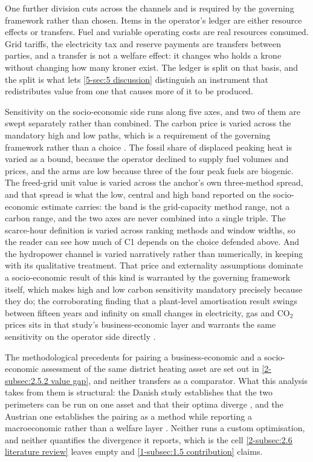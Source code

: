 One further division cuts across the channels and is required by the governing framework rather than chosen. Items in the operator's ledger are either resource effects or transfers. Fuel and variable operating costs are real resources consumed. Grid tariffs, the electricity tax and reserve payments are transfers between parties, and a transfer is not a welfare effect: it changes who holds a krone without changing how many kroner exist. The ledger is split on that basis, and the split is what lets \autoref{5-sec:5 discussion} distinguish an instrument that redistributes value from one that causes more of it to be produced.

Sensitivity on the socio-economic side runs along five axes, and two of them are swept separately rather than combined. The carbon price is varied across the mandatory high and low paths, which is a requirement of the governing framework rather than a choice \cite{finansdepartement_prinsipper_2021}. The fossil share of displaced peaking heat is varied as a bound, because the operator declined to supply fuel volumes and prices, and the arms are low because three of the four peak fuels are biogenic. The freed-grid unit value is varied across the anchor's own three-method spread, and that spread is what the low, central and high band reported on the socio-economic estimate carries: the band is the grid-capacity method range, not a carbon range, and the two axes are never combined into a single triple. The scarce-hour definition is varied across ranking methods and window widths, so the reader can see how much of C1 depends on the choice defended above. And the hydropower channel is varied narratively rather than numerically, in keeping with its qualitative treatment. That price and externality assumptions dominate a socio-economic result of this kind is warranted by the governing framework itself, which makes high and low carbon sensitivity mandatory precisely because they do; the corroborating finding that a plant-level amortisation result swings between fifteen years and infinity on small changes in electricity, gas and CO$_2$ prices sits in that study's business-economic layer and warrants the same sensitivity on the operator side directly \cite{moser_socioeconomic_2018}.

The methodological precedents for pairing a business-economic and a socio-economic assessment of the same district heating asset are set out in \autoref{2-subsec:2.5.2 value gap}, and neither transfers as a comparator. What this analysis takes from them is structural: the Danish study establishes that the two perimeters can be run on one asset and that their optima diverge \cite{ostergaard_business_2019}, and the Austrian one establishes the pairing as a method while reporting a macroeconomic rather than a welfare layer \cite{moser_socioeconomic_2018}. Neither runs a custom optimisation, and neither quantifies the divergence it reports, which is the cell \autoref{2-subsec:2.6 literature review} leaves empty and \autoref{1-subsec:1.5 contribution} claims.

